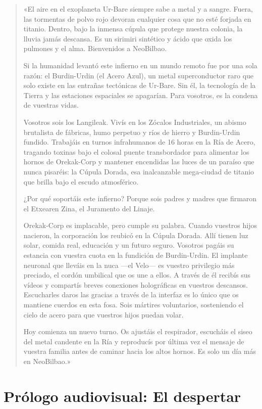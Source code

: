 \begin{quote}
«El aire en el exoplaneta Ur-Bare siempre sabe a metal y a sangre. Fuera, las tormentas de polvo rojo devoran cualquier cosa que no esté forjada en titanio. Dentro, bajo la inmensa cúpula que protege nuestra colonia, la lluvia jamás descansa. Es un sirimiri sintético y ácido que oxida los pulmones y el alma. Bienvenidos a NeoBilbao.

Si la humanidad levantó este infierno en un mundo remoto fue por una sola razón: el Burdin-Urdin (el Acero Azul), un metal superconductor raro que solo existe en las entrañas tectónicas de Ur-Bare. Sin él, la tecnología de la Tierra y las estaciones espaciales se apagarían. Para vosotros, es la condena de vuestras vidas.

Vosotros sois los Langileak. Vivís en los Zócalos Industriales, un abismo brutalista de fábricas, humo perpetuo y ríos de hierro y Burdin-Urdin fundido. Trabajáis en turnos infrahumanos de 16 horas en la Ría de Acero, tragando toxinas bajo el colosal puente transbordador para alimentar los hornos de Orekak-Corp y mantener encendidas las luces de un paraíso que nunca pisaréis: la Cúpula Dorada, esa inalcanzable mega-ciudad de titanio que brilla bajo el escudo atmosférico.

¿Por qué soportáis este infierno? Porque sois padres y madres que firmaron el Etxearen Zina, el Juramento del Linaje.

Orekak-Corp es implacable, pero cumple su palabra. Cuando vuestros hijos nacieron, la corporación los reubicó en la Cúpula Dorada. Allí tienen luz solar, comida real, educación y un futuro seguro. Vosotros pagáis su estancia con vuestra cuota en la fundición de Burdin-Urdin. El implante neuronal que lleváis en la nuca ---el Velo--- es vuestro privilegio más preciado, el cordón umbilical que os une a ellos. A través de él recibís sus vídeos y compartís breves conexiones holográficas en vuestros descansos. Escucharles daros las gracias a través de la interfaz es lo único que os mantiene cuerdos en esta fosa. Sois mártires voluntarios, sosteniendo el cielo de acero para que vuestros hijos puedan volar.

Hoy comienza un nuevo turno. Os ajustáis el respirador, escucháis el siseo del metal candente en la Ría y reproducís por última vez el mensaje de vuestra familia antes de caminar hacia los altos hornos. Es solo un día más en NeoBilbao.»
\end{quote}

\section{Prólogo audiovisual: El despertar}

